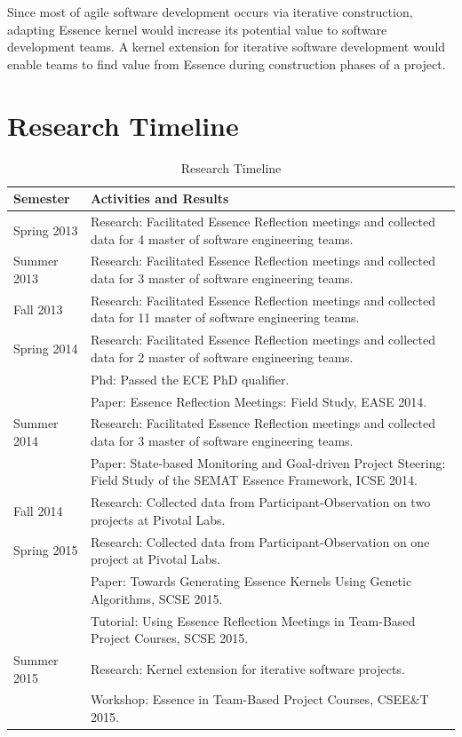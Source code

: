 \documentclass[preprint,12pt,3p]{elsarticle}
\begin{document}
Since most of agile software development occurs via iterative construction, adapting Essence kernel would increase its potential value to software development teams. A kernel extension for iterative software development would enable teams to find value from Essence during construction phases of a project.

\appendix
\section{Research Timeline}
\label{appendix}

\begin{table}[H]
\caption{Research Timeline}
\label{ResearchTimeline}
\centering
\begin{tabular}{|p{1.00in}|p{5.00in}|}
\hline
Semester    & Activities and Results  \\ \hline
Spring 2013 & Research: Facilitated Essence Reflection meetings and collected data for 4 master of software engineering teams. \\ \hline
Summer 2013 & Research: Facilitated Essence Reflection meetings and collected data for 3 master of software engineering teams.  \\ \hline
Fall 2013   & Research: Facilitated Essence Reflection meetings and collected data for 11 master of software engineering teams.  \\ \hline
Spring 2014 & Research: Facilitated Essence Reflection meetings and collected data for 2 master of software engineering teams.\\ 
            & Phd: Passed the ECE PhD qualifier.\\ 
            & Paper: Essence Reflection Meetings: Field Study, EASE 2014. \\ \hline
Summer 2014 & Research: Facilitated Essence Reflection meetings and collected data for 3 master of software engineering teams.\\ 
            & Paper: State-based Monitoring and Goal-driven Project Steering: Field Study of the SEMAT Essence Framework, ICSE 2014. \\ \hline
Fall 2014   & Research: Collected data from Participant-Observation on two projects at Pivotal Labs.  \\ \hline
Spring 2015 & Research: Collected data from Participant-Observation on one project at Pivotal Labs.\\ 
            & Paper: Towards Generating Essence Kernels Using Genetic Algorithms, SCSE 2015.\\ 
            & Tutorial: Using Essence Reflection Meetings in Team-Based Project Courses, SCSE 2015. \\ \hline
Summer 2015 & Research: Kernel extension for iterative software projects.\\ 
            & Workshop: Essence in Team-Based Project Courses, CSEE\&T 2015. \\ \hline                     
\end{tabular}
\end{table}
\end{document}
